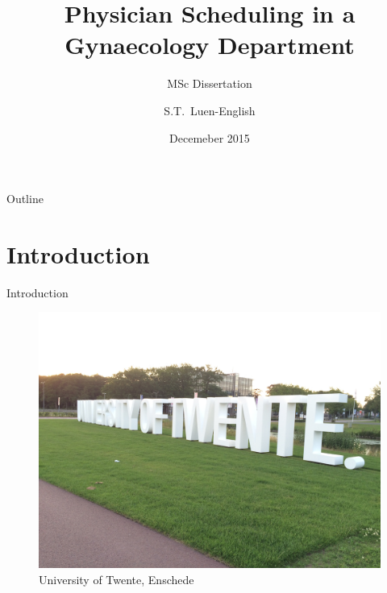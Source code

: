 \documentclass{beamer}
\title[Physician Scheduling]{Physician Scheduling in a Gynaecology Department}
\subtitle{MSc Dissertation}
\author{S.T.~Luen-English}
\institute[Cardiff University]
{
  Department of Mathematics\\
  Cardiff University}
\date{Decemeber 2015}
\begin{document}
\begin{frame}
  \titlepage
\end{frame}

\begin{frame}{Outline}
\setcounter{tocdepth}{1}
  \tableofcontents
\end{frame}

\section{Introduction}

\begin{frame}{Introduction}
    \begin{figure}
        \centering
        \includegraphics[width=0.6\linewidth]{img/utwente}
        \caption{University of Twente, Enschede}
    \end{figure}
\end{frame}
\end{document}
